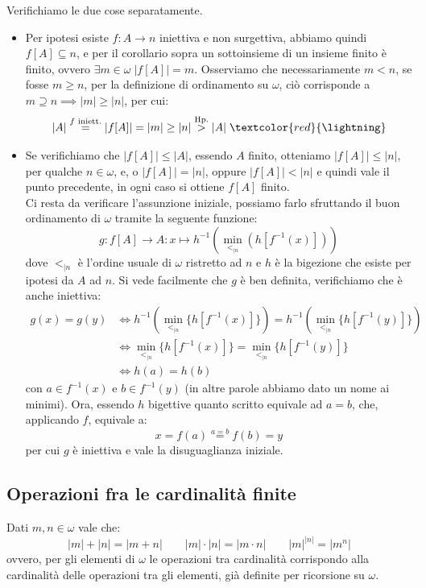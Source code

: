 \begin{soln}
	Verifichiamo le due cose separatamente.
	\begin{itemize}
		\item Per ipotesi esiste $f : A \to n$ iniettiva e non surgettiva, abbiamo quindi $f[A] \subseteq n$, e per il corollario sopra un sottoinsieme di un insieme finito è finito, ovvero $\exists m \in \omega \; |f[A]| = m$.
		Osserviamo che necessariamente $m < n$, se fosse $m \geq n$, per la definizione di ordinamento su $\omega$, ciò corrisponde a $m \supseteq n \implies |m| \geq |n|$, per cui:
		\[ |A| \overset{\text{$f$ iniett.}}{=} |f[A]| = |m| \geq |n| \overset{\text{Hp.}}{>} |A| \;\textcolor{red}{\lightning}
			\] 
		\item Se verifichiamo che $|f[A]| \leq |A|$, essendo $A$ finito, otteniamo $|f[A]| \leq |n|$, per qualche $n \in \omega$, e, o $|f[A]| = |n|$, oppure $|f[A]| < |n|$ e quindi vale il punto precedente, in ogni caso si ottiene $f[A]$ finito.\\
		Ci resta da verificare l'assunzione iniziale, possiamo farlo sfruttando il buon ordinamento di $\omega$ tramite la seguente funzione:
		\[ g : f[A] \to A : x \mapsto h^{-1}\left(\min_{<_{|n}}(h[f^{-1}(x)])\right)
			\]
		dove $<_{|n}$ è l'ordine usuale di $\omega$ ristretto ad $n$ e $h$ è la bigezione che esiste per ipotesi da $A$ ad $n$.
		Si vede facilmente che $g$ è ben definita, verifichiamo che è anche iniettiva:
		\[	\begin{split}
			g(x) = g(y) &\iff h^{-1}\left(\min_{<_{|n}}\{h[f^{-1}(x)]\}\right) = h^{-1}\left(\min_{<_{|n}}\{h[f^{-1}(y)]\}\right) \\
						&\iff \min_{<_{|n}}\{h[f^{-1}(x)]\} = \min_{<_{|n}}\{h[f^{-1}(y)]\} \\
						&\iff h(a) = h(b)
		\end{split}
			\]
		con $a \in f^{-1}(x)$ e $b \in f^{-1}(y)$ (in altre parole abbiamo dato un nome ai minimi). Ora, essendo $h$ bigettive quanto scritto equivale ad $a  = b$, che, applicando $f$,
		equivale a:
		\[ x = f(a) \overset{a = b}{=} f(b) = y
			\]
		per cui $g$ è iniettiva e vale la disuguaglianza iniziale.
	\end{itemize}
\end{soln}

\subsection{Operazioni fra le cardinalità finite}

\begin{proposition}
	\label{op_card_fin}
	Dati $m,n \in \omega$ vale che:
	\[ |m| + |n| = |m+n| \qquad |m|\cdot|n| = |m \cdot n| \qquad |m|^{|n|} = |m^n|
		\]
	ovvero, per gli elementi di $\omega$ le operazioni tra cardinalità corrispondo alla cardinalità delle operazioni tra gli elementi, già definite per ricorsione su $\omega$.
\end{proposition}

